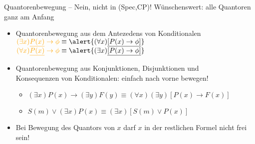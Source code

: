 \begin{frame}
  {Quantorenbewegung -- Nein, nicht in (Spec,CP)!}
  \onslide<+->
  \onslide<+->
  Wünschenswert: alle Quantoren ganz am Anfang\\
  \Halbzeile
  \begin{itemize}[<+->]
    \item Quantorenbewegung aus dem \alert{Antezedens von Konditionalen}\\
      $\orongsch{(\exists x)\underline{P(x)}\rightarrow\phi}\equiv\alert{(\forall x)\underline{[P(x)\rightarrow\phi]}}$\\
      $\orongsch{(\forall x)\underline{P(x)}\rightarrow\phi}\equiv\alert{(\exists x)\underline{[P(x)\rightarrow\phi]}}$
      \Halbzeile
    \item Quantorenbewegung aus \alert{Konjunktionen}, \alert{Disjunktionen} und\\
      \alert{Konsequenzen von Konditionalen:} \alert{einfach nach vorne bewegen!}
      \Halbzeile
      \begin{itemize}[<+->]
        \item $(\exists x)P(x)\rightarrow(\exists y)F(y)\equiv(\forall x)(\exists y)[P(x)\rightarrow F(x)]$\\
          \Viertelzeile
        \item $S(m)\vee (\exists x)P(x)\equiv(\exists x)[S(m)\vee P(x)]$\\
      \end{itemize}
      \Halbzeile
    \item Bei Bewegung des Quantors von $x$ darf $x$ in der restlichen Formel nicht frei sein!
  \end{itemize}
\end{frame}

